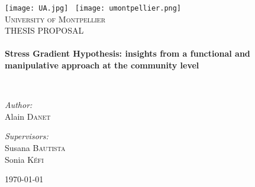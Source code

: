 \begin{titlepage}
\begin{center}

\texttt{[image: UA.jpg]}~ \hfill \texttt{[image: umontpellier.png]}~\\[1cm]

\textsc{\LARGE University of Montpellier}\\[1.5cm]

\textsc{\large THESIS PROPOSAL}\\[0.5cm]

\HRule \\[0.4cm]
{ \Large \bfseries Stress Gradient Hypothesis: insights from a functional and manipulative approach at the community level\\[0.4cm] }


\HRule \\[1.5cm]

\noindent
\begin{minipage}{0.4\textwidth}
\begin{flushleft} \large
\emph{Author:}\\
Alain \textsc{Danet}
\end{flushleft}
\end{minipage}
\begin{minipage}{0.4\textwidth}
\begin{flushright} \large
\emph{Supervisors:} \\
Susana \textsc{Bautista} \\[0.0cm]
Sonia \textsc{Kéfi}
\end{flushright}
\end{minipage}

\vfill

{\large \today}

\end{center}
\end{titlepage}
